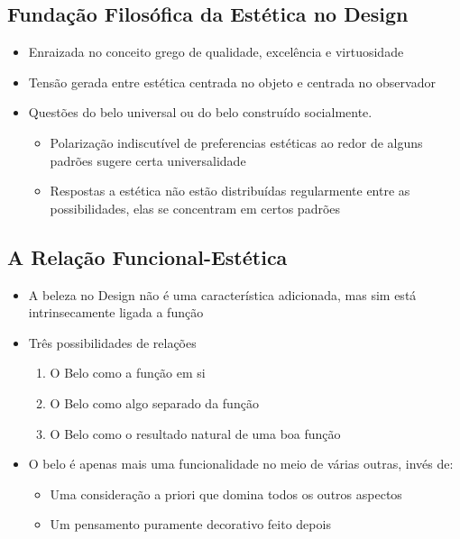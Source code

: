 \documentclass{article}
\begin{document}
\subsection{Fundação Filosófica da Estética no Design}
\begin{itemize}
    \item Enraizada no conceito grego de qualidade, excelência e virtuosidade
    \item Tensão gerada entre estética centrada no objeto e centrada no observador
    \item Questões do belo universal ou do belo construído socialmente.
    \begin{itemize}
        \item Polarização indiscutível de preferencias estéticas ao redor de alguns padrões sugere certa universalidade
        \item Respostas a estética não estão distribuídas regularmente entre as possibilidades, elas se concentram em certos padrões
    \end{itemize}
\end{itemize}
\subsection{A Relação Funcional-Estética}
\begin{itemize}
    \item A beleza no Design não é uma característica adicionada, mas sim está intrinsecamente ligada a função
    \item Três possibilidades de relações
    \begin{enumerate}
        \item O Belo como a função em si
        \item O Belo como algo separado da função
        \item O Belo como o resultado natural de uma boa função
    \end{enumerate}
    \item O belo é apenas mais uma funcionalidade no meio de várias outras, invés de:
    \begin{itemize}
        \item Uma consideração a priori que domina todos os outros aspectos
        \item Um pensamento puramente decorativo feito depois
    \end{itemize}
\end{itemize}
\end{document}
